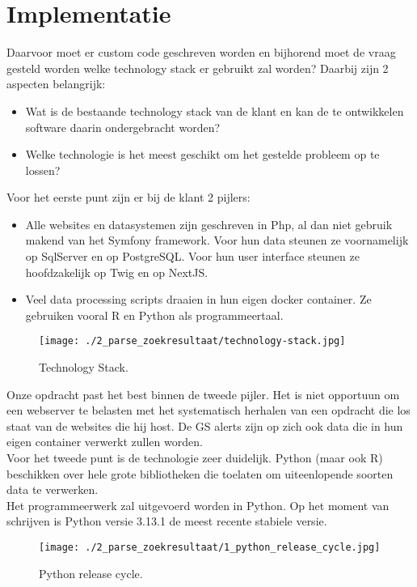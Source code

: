 \section{Implementatie}
Daarvoor moet er custom code geschreven worden en bijhorend moet de vraag gesteld worden welke technology stack er gebruikt zal worden? Daarbij zijn 2 aspecten belangrijk:
\begin{itemize}
    \item Wat is de bestaande technology stack van de klant en kan de te ontwikkelen software daarin ondergebracht worden?
    \item Welke technologie is het meest geschikt om het gestelde probleem op te lossen?
\end{itemize}
Voor het eerste punt zijn er bij de klant 2 pijlers:
\begin{itemize}
    \item Alle websites en datasystemen zijn geschreven in Php, al dan niet gebruik makend van het Symfony framework. Voor hun data steunen ze voornamelijk op SqlServer en op PostgreSQL. Voor hun user interface steunen ze hoofdzakelijk op Twig en op NextJS.
    \item Veel data processing scripts draaien in hun eigen docker container. Ze gebruiken vooral R en Python als programmeertaal.
\end{itemize}
\begin{figure}[H]
    \centering
    \texttt{[image: ./2\_parse\_zoekresultaat/technology-stack.jpg]}
    \caption[Technology Stack.]{\label{fig:Technology Stack}Technology Stack.}
\end{figure}
Onze opdracht past het best binnen de tweede pijler. Het is niet opportuun om een webserver te belasten met het systematisch herhalen van een opdracht die los staat van de websites die hij host. De GS alerts zijn op zich ook data die in hun eigen container verwerkt zullen worden.\\
Voor het tweede punt is de technologie zeer duidelijk. Python (maar ook R) beschikken over hele grote bibliotheken die toelaten om uiteenlopende soorten data te verwerken.\\
Het programmeerwerk zal uitgevoerd worden in Python. Op het moment van schrijven is Python versie 3.13.1 de meest recente stabiele versie.
\begin{figure}[H]
    \centering
    \texttt{[image: ./2\_parse\_zoekresultaat/1\_python\_release\_cycle.jpg]}
    \caption[Python release cycle.]{\label{fig:Python release cycle}Python release cycle.\autocite{pythonreleasecycle2025}}
\end{figure}
